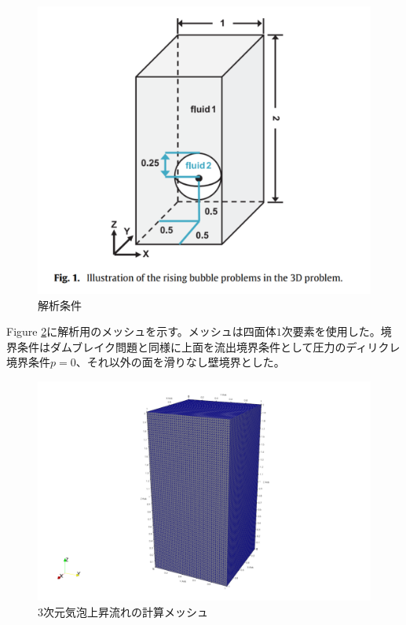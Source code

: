 \documentclass[8pt,a4paper]{article}
\begin{document}
\begin{figure}[H]
	\centering
	\includegraphics[width=10truecm]{pics/3d-bubble/setting.pdf}
	\caption{解析条件\cite{Safi2017}}
	\label{fig:3d-bubble-setting}
\end{figure}

Figure \ref{fig:3d-bubble-mesh}に解析用のメッシュを示す。メッシュは四面体$1$次要素を使用した。境界条件はダムブレイク問題と同様に上面を流出境界条件として圧力のディリクレ境界条件$p=0$、それ以外の面を滑りなし壁境界とした。

\begin{figure}[H]
	\centering
	\includegraphics[width=10truecm]{pics/3d-bubble/mesh.pdf}
	\caption{3次元気泡上昇流れの計算メッシュ}
	\label{fig:3d-bubble-mesh}
\end{figure}
\end{document}
